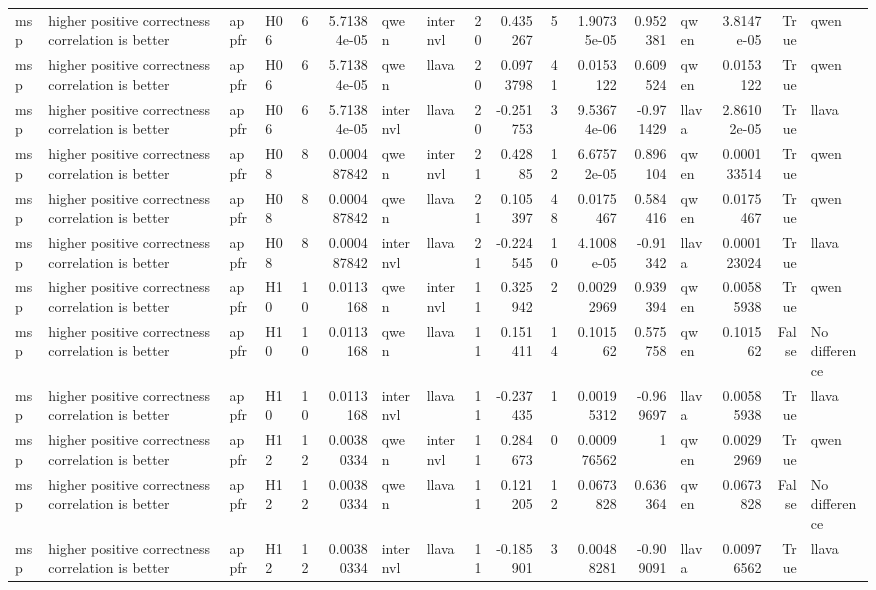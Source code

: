 \begin{longtable}{llllrrllrrrrrlrrl}
msp & higher positive correctness correlation is better & appfr & H06 & 6 & 5.71384e-05 & qwen & internvl & 20 & 0.435267 & 5 & 1.90735e-05 & 0.952381 & qwen & 3.8147e-05 & True & qwen \\
msp & higher positive correctness correlation is better & appfr & H06 & 6 & 5.71384e-05 & qwen & llava & 20 & 0.0973798 & 41 & 0.0153122 & 0.609524 & qwen & 0.0153122 & True & qwen \\
msp & higher positive correctness correlation is better & appfr & H06 & 6 & 5.71384e-05 & internvl & llava & 20 & -0.251753 & 3 & 9.53674e-06 & -0.971429 & llava & 2.86102e-05 & True & llava \\
msp & higher positive correctness correlation is better & appfr & H08 & 8 & 0.000487842 & qwen & internvl & 21 & 0.42885 & 12 & 6.67572e-05 & 0.896104 & qwen & 0.000133514 & True & qwen \\
msp & higher positive correctness correlation is better & appfr & H08 & 8 & 0.000487842 & qwen & llava & 21 & 0.105397 & 48 & 0.0175467 & 0.584416 & qwen & 0.0175467 & True & qwen \\
msp & higher positive correctness correlation is better & appfr & H08 & 8 & 0.000487842 & internvl & llava & 21 & -0.224545 & 10 & 4.1008e-05 & -0.91342 & llava & 0.000123024 & True & llava \\
msp & higher positive correctness correlation is better & appfr & H10 & 10 & 0.0113168 & qwen & internvl & 11 & 0.325942 & 2 & 0.00292969 & 0.939394 & qwen & 0.00585938 & True & qwen \\
msp & higher positive correctness correlation is better & appfr & H10 & 10 & 0.0113168 & qwen & llava & 11 & 0.151411 & 14 & 0.101562 & 0.575758 & qwen & 0.101562 & False & No difference \\
msp & higher positive correctness correlation is better & appfr & H10 & 10 & 0.0113168 & internvl & llava & 11 & -0.237435 & 1 & 0.00195312 & -0.969697 & llava & 0.00585938 & True & llava \\
msp & higher positive correctness correlation is better & appfr & H12 & 12 & 0.00380334 & qwen & internvl & 11 & 0.284673 & 0 & 0.000976562 & 1 & qwen & 0.00292969 & True & qwen \\
msp & higher positive correctness correlation is better & appfr & H12 & 12 & 0.00380334 & qwen & llava & 11 & 0.121205 & 12 & 0.0673828 & 0.636364 & qwen & 0.0673828 & False & No difference \\
msp & higher positive correctness correlation is better & appfr & H12 & 12 & 0.00380334 & internvl & llava & 11 & -0.185901 & 3 & 0.00488281 & -0.909091 & llava & 0.00976562 & True & llava \\

\end{longtable}
